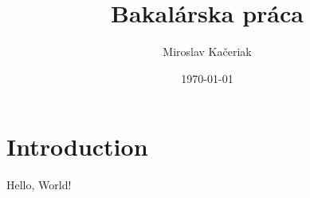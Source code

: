 \documentclass{article}
\title{Bakalárska práca}
\author{Miroslav Kačeriak}
\date{\today}
\begin{document}
\maketitle

\section{Introduction}



Hello, World!
\end{document}
